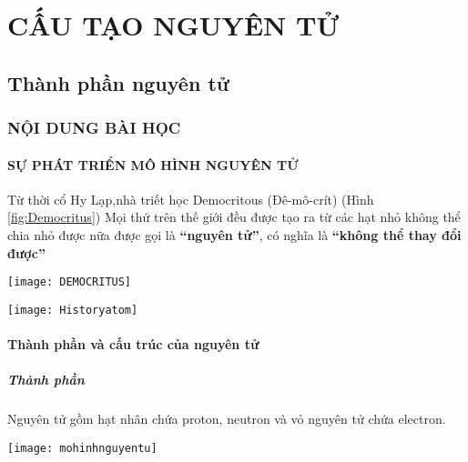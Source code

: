 \chapter{CẤU TẠO NGUYÊN TỬ}
\section{Thành phần nguyên tử}
\subsection{NỘI DUNG BÀI HỌC}
\subsubsection{SỰ PHÁT TRIỂN MÔ HÌNH NGUYÊN TỬ}
\begin{hoplythuyet}
	\begin{minipage}[htp!]{0.5\textwidth}
		Từ thời cổ Hy Lạp,nhà triết học Democritous (Đê-mô-crít) (Hình \ref{fig:Democritus})
		Mọi thứ trên thế giới đều được tạo ra từ các hạt nhỏ không thể chia nhỏ được nữa được gọi là \textbf{“nguyên tử”}, có nghĩa là \textbf{“không thể thay đổi được”}
	\end{minipage}
	\begin{minipage}[htp!]{0.5\textwidth}
		\begin{center}
			\texttt{[image: DEMOCRITUS]}
		\end{center}
	\end{minipage}
	
	\begin{center}
		\texttt{[image: Historyatom]}
	\end{center}
\end{hoplythuyet}
\subsubsection{Thành phần và cấu trúc của nguyên tử}
\paragraph{Thành phần}
\begin{hoplythuyet}
	Nguyên tử gồm hạt nhân chứa proton, neutron và vỏ nguyên tử chứa electron.
	\begin{center}
		\texttt{[image: mohinhnguyentu]}
	\end{center}
\end{hoplythuyet}
